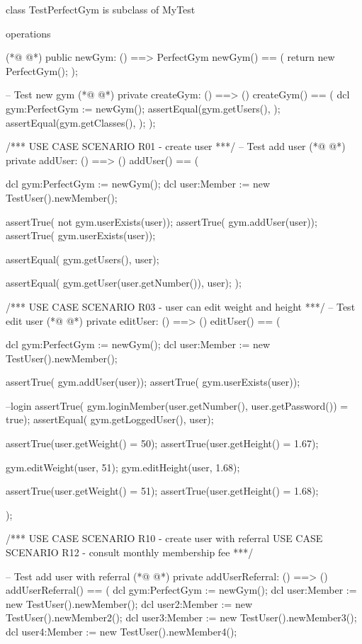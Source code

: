 \begin{vdmpp}[breaklines=true]
class TestPerfectGym is subclass of MyTest
 
operations
 
(*@
\label{newGym:5}
@*)
  public newGym: () ==> PerfectGym
 newGym() == (
  return new PerfectGym();
 );
 
 -- Test new gym
(*@
\label{createGym:11}
@*)
 private createGym: () ==> ()
 createGym() == (
  dcl gym:PerfectGym := newGym();
  assertEqual(gym.getUsers(), {});
  assertEqual(gym.getClasses(), {});
 );
 
 /*** USE CASE SCENARIO R01 - create user ***/ 
 -- Test add user
(*@
\label{addUser:20}
@*)
 private addUser: () ==> ()
 addUser() == (
    
    dcl gym:PerfectGym := newGym();
    dcl user:Member := new TestUser().newMember();
    
    assertTrue( not gym.userExists(user));
    assertTrue( gym.addUser(user));
    assertTrue( gym.userExists(user));
    
    assertEqual( gym.getUsers(), {user});
    
    assertEqual( gym.getUser(user.getNumber()), user); 
 );
 
 /*** USE CASE SCENARIO R03 - user can edit weight and height ***/ 
 -- Test edit user
(*@
\label{editUser:37}
@*)
 private editUser: () ==> ()
 editUser() == (
    
    dcl gym:PerfectGym := newGym();
    dcl user:Member := new TestUser().newMember();
    
    assertTrue( gym.addUser(user));
    assertTrue( gym.userExists(user));
     
    --login
    assertTrue( gym.loginMember(user.getNumber(), user.getPassword()) = true);
     assertEqual( gym.getLoggedUser(), user); 
   
    assertTrue(user.getWeight() = 50);
    assertTrue(user.getHeight() = 1.67); 
    
    gym.editWeight(user, 51);
    gym.editHeight(user, 1.68);
    
    assertTrue(user.getWeight() = 51);
    assertTrue(user.getHeight() = 1.68); 
    
 );
 
 /*** USE CASE SCENARIO R10 - create user with referral   
         USE CASE SCENARIO R12 - consult monthly membership fee ***/
 
 -- Test add user with referral
(*@
\label{addUserReferral:65}
@*)
 private addUserReferral: () ==> ()
 addUserReferral() == (
   dcl gym:PerfectGym := newGym();
   dcl user:Member := new TestUser().newMember();
   dcl user2:Member := new TestUser().newMember2();
   dcl user3:Member := new TestUser().newMember3();
   dcl user4:Member := new TestUser().newMember4();
    

\end{vdmpp}
